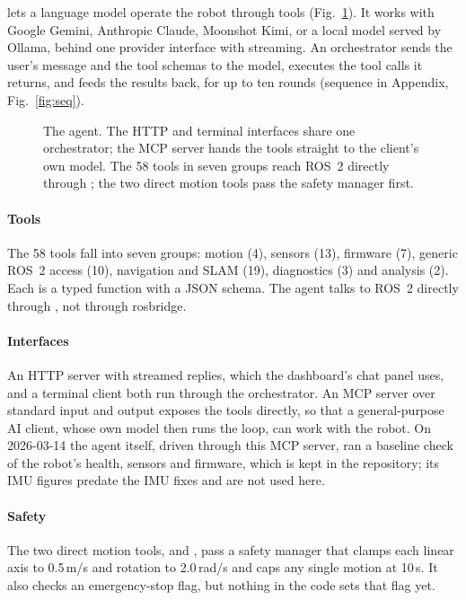\documentclass[11pt]{article}
\begin{document}
 lets a language model operate the robot through tools (Fig.~\ref{fig:agent}). It works with Google Gemini, Anthropic Claude, Moonshot Kimi, or a local model served by Ollama, behind one provider interface with streaming. An orchestrator sends the user's message and the tool schemas to the model, executes the tool calls it returns, and feeds the results back, for up to ten rounds (sequence in Appendix, Fig.~\ref{fig:seq}).

\begin{figure}[htbp]
  \centering
  \caption{The agent. The HTTP and terminal interfaces share one orchestrator; the MCP server hands the tools straight to the client's own model. The 58 tools in seven groups reach ROS~2 directly through ; the two direct motion tools pass the safety manager first.}
  \label{fig:agent}
\end{figure}

\paragraph{Tools} The 58 tools fall into seven groups: motion (4), sensors (13), firmware (7), generic ROS~2 access (10), navigation and SLAM (19), diagnostics (3) and analysis (2). Each is a typed function with a JSON schema. The agent talks to ROS~2 directly through , not through rosbridge.

\paragraph{Interfaces} An HTTP server with streamed replies, which the dashboard's chat panel uses, and a terminal client both run through the orchestrator. An MCP server over standard input and output exposes the tools directly, so that a general-purpose AI client, whose own model then runs the loop, can work with the robot. On 2026-03-14 the agent itself, driven through this MCP server, ran a baseline check of the robot's health, sensors and firmware, which is kept in the repository; its IMU figures predate the IMU fixes and are not used here.

\paragraph{Safety} The two direct motion tools,  and , pass a safety manager that clamps each linear axis to 0.5\,m/s and rotation to 2.0\,rad/s and caps any single motion at 10\,s. It also checks an emergency-stop flag, but nothing in the code sets that flag yet.
\end{document}
